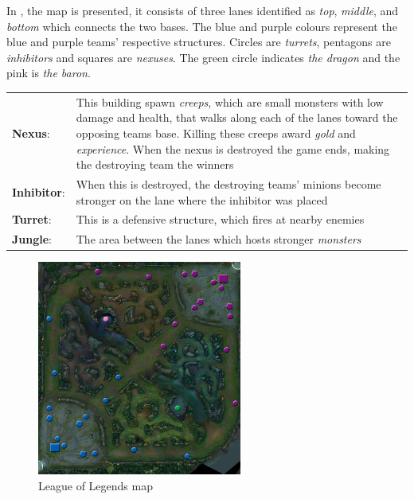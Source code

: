 In , the map is presented, it consists of three lanes identified as \emph{top}, \emph{middle}, and \emph{bottom} which connects the two bases. The blue and purple colours represent the blue and purple teams' respective structures. Circles are \emph{turrets}, pentagons are \emph{inhibitors} and squares are \emph{nexuses}. The green circle indicates \emph{the dragon} and the pink is \emph{the baron}.

\begin{table}[!h]
  \begin{tabular}{l p{13cm}}
    \textbf{Nexus}: & This building spawn \emph{creeps}, which are small monsters with low damage and health, that walks along each of the lanes toward the opposing teams base. Killing these creeps award \emph{gold} and \emph{experience}. When the nexus is destroyed the game ends, making the destroying team the winners\\
    \textbf{Inhibitor}: & When this is destroyed, the destroying teams' minions become stronger on the lane where the inhibitor was placed\\
    \textbf{Turret}: & This is a defensive structure, which fires at nearby enemies\\
    \textbf{Jungle}: & The area between the lanes which hosts stronger \emph{monsters}\\
  \end{tabular}
\end{table}

\begin{figure}[!htb]
  \centering
    \includegraphics[width=0.6\textwidth]{img/lolmap.jpg}
  \caption{League of Legends map~\cite{lolmap}}\label{fig:lolmap}
\end{figure}

